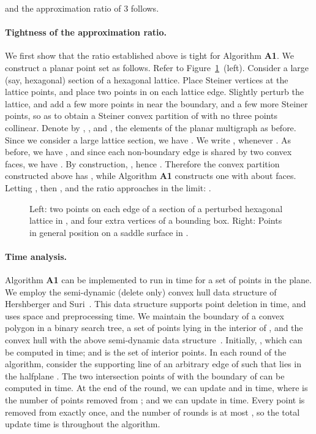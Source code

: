 \documentclass[11pt]{article}
\newcommand{\figlab}[1]{\label{fig:#1}}
\newcommand{\figref}[1]{Figure~\ref{fig:#1}}
\begin{document}
and the approximation ratio of 3 follows.

\paragraph{Tightness of the approximation ratio.}  We
first show that the ratio  established above is tight for Algorithm {\bf A1}.
We construct a planar point set  as follows. Refer to  \figref{fig:tightness}~(left).
Consider a large (say, hexagonal) section of a hexagonal lattice.  Place Steiner
vertices at the lattice points, and place two points in  on each
lattice edge. Slightly perturb the lattice, and add a few more points
in  near the boundary, and a few more Steiner points, so as to
obtain a Steiner convex partition of  with no three points
collinear. Denote by , , and , the elements of the planar
multigraph  as before. Since we consider a large lattice section,
we have . We write , whenever .
As before, we have , and since each non-boundary edge is
shared by two convex faces, we have . By construction,
, hence . Therefore the convex
partition constructed above has , while Algorithm {\bf A1}
constructs one with about  faces. Letting , then , and the ratio  approaches  in the limit:
.
\medskip

\begin{figure} [htb]
\centerline{\epsfxsize=5in }
    \caption{Left: two points on each edge of a section of a perturbed
      hexagonal lattice in , and four extra vertices of a bounding box.
     Right: Points in general position on a saddle surface in .}
    \figlab{fig:tightness}
\end{figure}

\paragraph{Time analysis.} Algorithm {\bf A1} can be implemented to
run in  time for a set  of  points in the plane.
We employ the semi-dynamic (delete only) convex
hull data structure of Hershberger and Suri~\cite{HS92}. This data
structure supports point deletion in  time, and uses 
space and  preprocessing time. We maintain the boundary of
a convex polygon  in a binary search tree, a set  of
points lying in the interior of , and the convex hull 
with the above semi-dynamic data structure~\cite{HS92}.  Initially,
, which can be computed in  time; and
 is the set of interior points.  In each round of the
algorithm, consider the supporting line  of an arbitrary edge 
of  such that  lies in the halfplane .  The two
intersection points of  with the boundary of  can be computed in
 time. At the end of the round, we can update  and  in  time, where  is the
number of points removed from ; and we can update  in  time. Every point is removed from  exactly
once, and the number of rounds is at most , so
the total update time is  throughout the algorithm.
\end{document}
